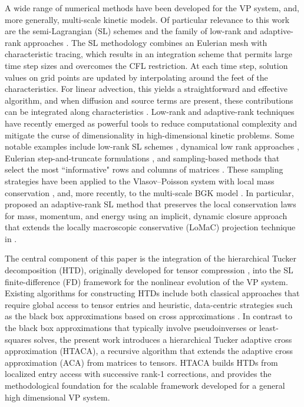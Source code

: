 \documentclass{article}
\theoremstyle{plain}
\theoremstyle{definition}
\theoremstyle{remark}
\begin{document}
A wide range of numerical methods have been developed for the VP system, and, more generally, multi-scale kinetic models. Of particular relevance to this work are the semi-Lagrangian (SL) schemes \cite{sonnendrucker1999semi, qiu2010conservative, rossmanith2011positivity, qiu2011conservative, DimarcoReview2014, cho2024conservative} and the family of low-rank and adaptive-rank approaches \cite{einkemmer2025review}. The SL methodology combines an Eulerian mesh with characteristic tracing, which results in an integration scheme that permits large time step sizes and overcomes the CFL restriction. At each time step, solution values on grid points are updated by interpolating around the feet of the characteristics. For linear advection, this yields a straightforward and effective algorithm, and when diffusion and source terms are present, these contributions can be integrated along characteristics \cite{li2023high, ding2020semi}. Low-rank and adaptive-rank techniques have recently emerged as powerful tools to reduce computational complexity and mitigate the curse of dimensionality in high-dimensional kinetic problems. Some notable examples include low-rank SL schemes \cite{kormann2015semi}, dynamical low rank approaches \cite{einkemmer2018low, einkemmer2021mass, dektor2024interpolatory}, Eulerian step-and-truncate formulations \cite{guo2022low,sands2025transport}, and sampling-based methods that select the most ``informative" rows and columns of matrices \cite{zheng2025semi, sands2025adaptive}. These sampling strategies have been applied to the Vlasov–Poisson system with local mass conservation \cite{zheng2025semi}, and, more recently, to the multi-scale BGK model \cite{sands2025adaptive}. In particular, \cite{sands2025adaptive} proposed an adaptive-rank SL method that preserves the local conservation laws for mass, momentum, and energy using an implicit, dynamic closure approach that extends the locally macroscopic conservative (LoMaC) projection technique in \cite{guo2024local}.

The central component of this paper is the integration of the hierarchical Tucker decomposition (HTD), originally developed for tensor compression \cite{hackbusch2009new}, into the SL finite-difference (FD) framework for the nonlinear evolution of the VP system. Existing algorithms for constructing HTDs include both classical approaches that require global access to tensor entries \cite{grasedyck2010hierarchical,kressner2012htucker} and heuristic, data-centric strategies such as the black box approximations based on cross approximations \cite{espig2009black,ballani2013black}. In contrast to the black box approximations that typically involve pseudoinverses or least-squares solves, the present work introduces a hierarchical Tucker adaptive cross approximation (HTACA), a recursive algorithm that extends the adaptive cross approximation (ACA) from matrices to tensors. HTACA builds HTDs from localized entry access 
{with successive rank-1 corrections,} and provides the methodological foundation for the scalable framework developed for a general high dimensional VP system.  
\end{document}
